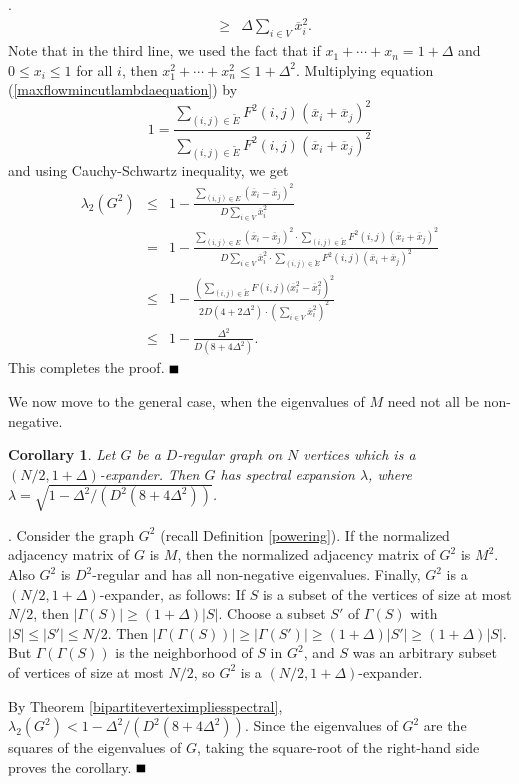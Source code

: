 \documentclass{article}
\newtheorem{corollary}[theorem]{Corollary}
\newcommand{\bproof}{\noindent{\bf Proof}}
\newcommand{\eproof}{\hspace*{\fill}$\rule{2mm}{2mm}$~~~~\bigskip}
\renewenvironment{proof}{\bproof. }{\eproof}
\begin{document}
\begin{proof}
\begin{eqnarray*}
 & \geq & \Delta\sum_{i\in V}\overline{x}_i^2.
\end{eqnarray*}
Note that in the third line, we used the fact that if $x_1+\cdots +x_n=1+\Delta$ and $0\leq x_i\leq 1$ for all $i$, then $x_1^2+\cdots +x_n^2\leq 1+\Delta ^2$. Multiplying equation (\ref{maxflowmincutlambdaequation}) by
\[
1=\frac{\sum_{(i,j)\in\tilde{E}}F^2(i,j)(\overline{x}_i+\overline{x}_j)^2}{\sum_{(i,j)\in\tilde{E}}F^2(i,j)(\overline{x}_i+\overline{x}_j)^2}
\]
and using Cauchy-Schwartz inequality, we get
\begin{eqnarray*}
\lambda_2(G^2) & \leq & 1-\frac{\sum_{(i,j)\in E}(\overline{x}_i-\overline{x}_j)^2}{D\sum_{i\in V}\overline{x}_i^2}\\
 & = & 1-\frac{\sum_{(i,j)\in E}(\overline{x}_i-\overline{x}_j)^2\cdot\sum_{(i,j)\in\tilde{E}}F^2(i,j)(\overline{x}_i+\overline{x}_j)^2}{D\sum_{i\in V}\overline{x}_i^2\cdot\sum_{(i,j)\in\tilde{E}}F^2(i,j)(\overline{x}_i+\overline{x}_j)^2}\\
 & \leq & 1-\frac{\left (\sum_{(i,j)\in\tilde{E}}F(i,j)(\overline{x}_i^2-\overline{x}_j^2\right )^2}{2D(4+2\Delta^2)\cdot\left (\sum_{i\in V}\overline{x}_i^2\right )^2}\\
 & \leq & 1-\frac{\Delta^2}{D(8+4\Delta^2)}.
\end{eqnarray*}
This completes the proof.
\end{proof}

We now move to the general case, when the eigenvalues of $M$ need not all be non-negative.
\begin{corollary}
Let $G$ be a $D$-regular graph on $N$ vertices which is a $(N/2,1+\Delta )$-expander. Then $G$ has spectral expansion $\lambda$, where $\lambda =\sqrt{1-\Delta^2/(D^2(8+4\Delta^2))}$.
\end{corollary}
\begin{proof}
Consider the graph $G^2$ (recall Definition \ref{powering}). If the normalized adjacency matrix of $G$ is $M$, then the normalized adjacency matrix of $G^2$ is $M^2$. Also $G^2$ is $D^2$-regular and has all non-negative eigenvalues. Finally, $G^2$ is a $(N/2,1+\Delta )$-expander, as follows: If $S$ is a subset of the vertices of size at most $N/2$, then $|\Gamma (S)|\geq (1+\Delta )|S|$. Choose a subset $S'$ of $\Gamma (S)$ with $|S|\leq |S'|\leq N/2$. Then $|\Gamma (\Gamma (S))|\geq |\Gamma (S')|\geq (1+\Delta )|S'|\geq (1+\Delta )|S|$. But $\Gamma (\Gamma (S))$ is the neighborhood of $S$ in $G^2$, and $S$ was an arbitrary subset of vertices of size at most $N/2$, so $G^2$ is a $(N/2,1+\Delta )$-expander.

By Theorem \ref{bipartiteverteximpliesspectral}, $\lambda_2(G^2)<1-\Delta^2/(D^2(8+4\Delta^2))$. Since the eigenvalues of $G^2$ are the squares of the eigenvalues of $G$, taking the square-root of the right-hand side proves the corollary.
\end{proof}
\end{document}
